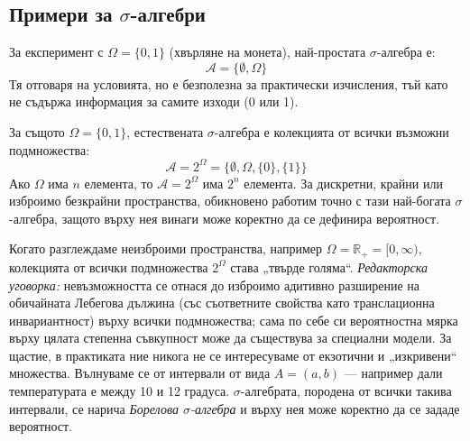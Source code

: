 \subsection{Примери за $\sigma$-алгебри}

\begin{example}\label{ex:01-10}
За експеримент с $\Omega = \{0, 1\}$ (хвърляне на монета), най-простата $\sigma$-алгебра е:
\[
\mathcal{A} = \{\emptyset, \Omega\}
\]
Тя отговаря на условията, но е безполезна за практически изчисления, тъй като не съдържа информация за самите изходи (0 или 1).
\end{example}

\begin{example}\label{ex:01-11}
За същото $\Omega = \{0, 1\}$, естествената $\sigma$-алгебра е колекцията от всички възможни подмножества:
\[
\mathcal{A} = 2^\Omega = \{\emptyset, \Omega, \{0\}, \{1\}\}
\]
Ако $\Omega$ има $n$ елемента, то $\mathcal{A} = 2^\Omega$ има $2^n$ елемента. За дискретни, крайни или изброимо безкрайни пространства, обикновено работим точно с тази най-богата $\sigma$-алгебра, защото върху нея винаги може коректно да се дефинира вероятност.
\end{example}

\begin{example}\label{ex:01-12}
Когато разглеждаме неизброими пространства, например $\Omega = \mathbb{R}_+ = [0, \infty)$, колекцията от всички подмножества $2^\Omega$ става „твърде голяма“. \emph{Редакторска уговорка:} невъзможността се отнася до изброимо адитивно разширение на обичайната Лебегова дължина (със съответните свойства като транслационна инвариантност) върху всички подмножества; сама по себе си вероятностна мярка върху цялата степенна съвкупност може да съществува за специални модели. За щастие, в практиката ние никога не се интересуваме от екзотични и „изкривени“ множества. Вълнуваме се от интервали от вида $A = (a, b)$ — например дали температурата е между 10 и 12 градуса. $\sigma$-алгебрата, породена от всички такива интервали, се нарича \emph{Борелова $\sigma$-алгебра} и върху нея може коректно да се зададе вероятност.
\end{example}

